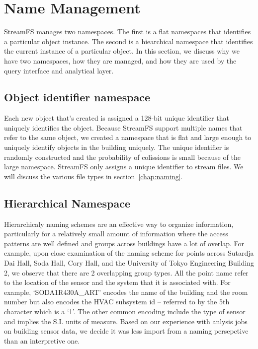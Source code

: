 \section{Name Management}

StreamFS manages two namespaces.  The first is a flat namespaces that identifies a particular
object instance.  The second is a hiearchical namespace that identifies the current instance
of a particular object.  In this section, we discuss why we have two namespaces, how
they are managed, and how they are used by the query interface and analytical layer.

\subsection{Object identifier namespace}

Each new object that's created is assigned a 128-bit unique identifier that uniquely identifies the object.
Because StreamFS support multiple names that refer to the same object, we created a namespace that is 
flat and large enough to uniquely identify objects in the building uniquely.  The unique identifier
is randomly constructed and the probability of colissions is small because of the large namespace.
StreamFS only assigns a unique identifier to stream files.  We will discuss the various file types in
section~\ref{chap:naming}.



\subsection{Hierarchical Namespace}

Hierarchicaly naming schemes are an effective way to organize information, particularly for a relatively small amount of information
where the access patterns are well defined and groups across buildings have a lot of overlap.  For example, upon close examination of
the naming scheme for points across Sutardja Dai Hall, Soda Hall, Cory Hall, and the University of Tokyo Engineering Building 2, we 
observe that there are 2 overlapping group types.  All the point name refer to the location of the sensor and the system that it is 
associated with.  For example, `SODA1R430A\_ART' encodes the name of the building and the room number but also encodes the HVAC subsystem id --
referred to by the 5th character which is a `1'.  The other common encoding include the type of sensor and implies the S.I. units of measure.
Based on our experience with anlysis jobs on building sensor data, we decide it was less import from a naming persepctive than 
an interpretive one.

